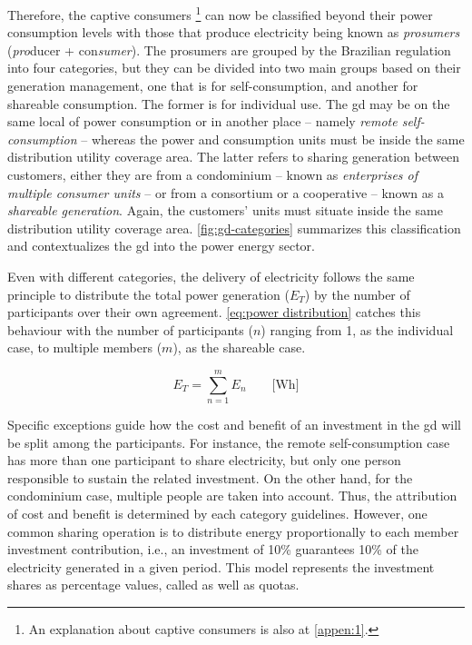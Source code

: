 Therefore, the captive consumers%
\footnote{An explanation about captive consumers is also at \autoref{appen:1}.}
can now be classified beyond their power consumption levels
with those that produce electricity being known as \emph{prosumers} (\emph{pro}ducer + con\emph{sumer}).
The prosumers are grouped by the Brazilian regulation into four categories,
but they can be divided into two main groups based on their generation management,
one that is for self-consumption, and another for shareable consumption.
The former is for individual use.
The \gls{gd} may be on the same local of power consumption or
in another place -- namely \emph{remote self-consumption} -- whereas the power and consumption units must be inside the same distribution utility coverage area.
The latter refers to sharing generation between customers,
either they are from a condominium -- known as \emph{enterprises of multiple consumer units} -- or
from a consortium or a cooperative -- known as a \emph{shareable generation}.
Again, the customers' units must situate inside the same distribution utility coverage area.
\autoref{fig:gd-categories} summarizes this classification and contextualizes the \gls{gd} into the power energy sector.



Even with different categories, the delivery of electricity follows the same principle to distribute the total power generation ($E_{T}$) by the number of participants over their own agreement.
\autoref{eq:power distribution} catches this behaviour with the number of participants ($n$) ranging from 1, as the individual case, to multiple members ($m$), as the shareable case.

\begin{equation}\label{eq:power distribution}
    E_{T} = \sum_{n=1}^{m} E_{n} \qquad \text{[Wh]}
\end{equation}

Specific exceptions guide how the cost and benefit of an investment in the \gls{gd} will be split among the participants.
For instance, the remote self-consumption case has more than one participant to share electricity, but only one person responsible to sustain the related investment.
On the other hand, for the condominium case, multiple people are taken into account.
Thus, the attribution of cost and benefit is determined by each category guidelines.
However, one common sharing operation is to distribute energy proportionally to each member investment contribution,
i.e., an investment of 10\% guarantees 10\% of the electricity generated in a given period.
This model represents the investment shares as percentage values, called as well as quotas.

